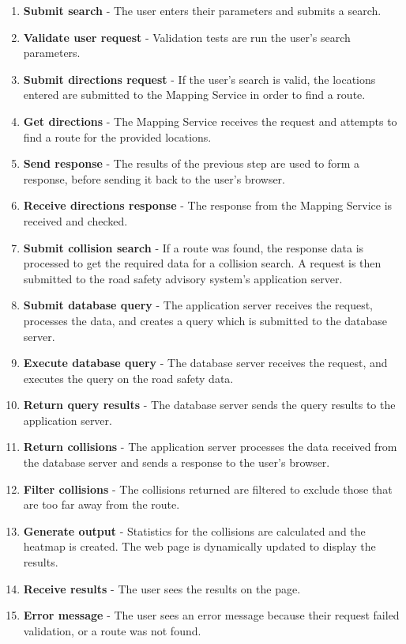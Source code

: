 \documentclass[authoryearcitations]{UoYCSproject}
\begin{document}
\begin{enumerate}
	\item \textbf{Submit search} - The user enters their parameters and submits a search.
	\item \textbf{Validate user request} - Validation tests are run the user's search parameters.
	\item \textbf{Submit directions request} - If the user's search is valid, the locations entered are submitted to the Mapping Service in order to find a route.
	\item \textbf{Get directions} - The Mapping Service receives the request and attempts to find a route for the provided locations.
	\item \textbf{Send response} - The results of the previous step are used to form a response, before sending it back to the user's browser.
	\item \textbf{Receive directions response} - The response from the Mapping Service is received and checked.
	\item \textbf{Submit collision search} - If a route was found, the response data is processed to get the required data for a collision search. A request is then submitted to the road safety advisory system's application server.
	\item \textbf{Submit database query} -  The application server receives the request, processes the data, and creates a query which is submitted to the database server.
	\item \textbf{Execute database query} - The database server receives the request, and executes the query on the road safety data.
	\item \textbf{Return query results} - The database server sends the query results to the application server.
	\item \textbf{Return collisions} - The application server processes the data received from the database server and sends a response to the user's browser.
	\item \textbf{Filter collisions} - The collisions returned are filtered to exclude those that are too far away from the route.
	\item \textbf{Generate output} - Statistics for the collisions are calculated and the heatmap is created. The web page is dynamically updated to display the results.
	\item \textbf{Receive results} - The user sees the results on the page.
	\item \textbf{Error message} - The user sees an error message because their request failed validation, or a route was not found.
\end{enumerate}
\end{document}
